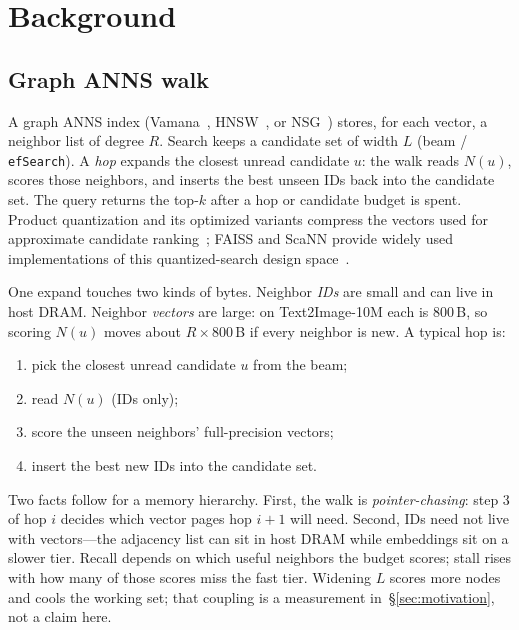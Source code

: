 \section{Background}
\label{sec:background}

\subsection{Graph ANNS walk}
\label{sec:bg-anns}

A graph ANNS index (Vamana~\cite{diskann}, HNSW~\cite{hnsw}, or NSG~\cite{nsg}) stores, for
each vector, a neighbor list of degree $R$. Search keeps a candidate set
of width $L$ (beam / \texttt{efSearch}). A \emph{hop} expands the closest
unread candidate $u$: the walk reads $N(u)$, scores those neighbors, and
inserts the best unseen IDs back into the candidate set. The query
returns the top-$k$ after a hop or candidate budget is spent.
Product quantization and its optimized variants compress the vectors used for
approximate candidate ranking~\cite{pq,opq}; FAISS and ScaNN provide widely
used implementations of this quantized-search design space~\cite{faiss,scann}.

One expand touches two kinds of bytes. Neighbor \emph{IDs} are small
and can live in host DRAM. Neighbor \emph{vectors} are large: on
Text2Image-10M each is 800\,B, so scoring $N(u)$ moves about
$R\times 800$\,B if every neighbor is new. A typical hop is:

\begin{enumerate}
  \item pick the closest unread candidate $u$ from the beam;
  \item read $N(u)$ (IDs only);
  \item score the unseen neighbors' full-precision vectors;
  \item insert the best new IDs into the candidate set.
\end{enumerate}

Two facts follow for a memory hierarchy. First, the walk is
\emph{pointer-chasing}: step 3 of hop $i$ decides which vector pages
hop $i{+}1$ will need. Second, IDs need not live with vectors---the
adjacency list can sit in host DRAM while embeddings sit on a slower
tier. Recall depends on which useful neighbors the budget scores; stall
rises with how many of those scores miss the fast tier. Widening $L$
scores more nodes and cools the working set; that coupling is a
measurement in~\S\ref{sec:motivation}, not a claim here.

